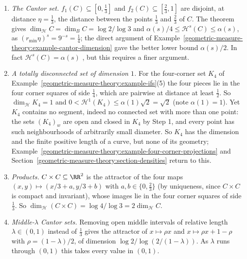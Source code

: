 \begin{example}\label{geometric-measure-theory:example-similarity-dimension}
\begin{enumerate}
\item \emph{The Cantor set.} $f_1(C) \subseteq [0, \frac13]$ and $f_2(C) \subseteq [\frac23, 1]$ are disjoint, at distance $\eta = \frac13$, the distance between the points $\frac13$ and $\frac23$ of $C$.
The theorem gives $\dim_{\mathcal{H}}C = \dim_BC = \log 2/\log 3$ and $\alpha(s)/4 \leq \mathcal{H}^s(C) \leq \alpha(s)$, as $(r_{\min}\eta)^s = 9^{-s} = \frac14$; the direct argument of
Example~\ref{geometric-measure-theory:example-cantor-dimension} gave the better lower bound $\alpha(s)/2$. In fact $\mathcal{H}^s(C) = \alpha(s)$ \cite{falconer-fractal}, but this requires a finer argument.
\item \emph{A totally disconnected set of dimension $1$.} For the four-corner set $K_4$ of Example~\ref{geometric-measure-theory:example-ifs}(5) the four pieces lie in the four corner squares of side $\frac14$,
which are pairwise at distance at least $\frac12$. So $\dim_{\mathcal{H}}K_4 = 1$ and $0 < \mathcal{H}^1(K_4) \leq \alpha(1)\sqrt2 = \sqrt2$ (note $\alpha(1) = 1$). Yet $K_4$ contains no segment, indeed no
connected set with more than one point: the sets $(K_4)_w$ are open and closed in $K_4$ by Step 1, and every point has such neighbourhoods of arbitrarily small diameter. So $K_4$ has the dimension and
the finite positive length of a curve, but none of its geometry; Example~\ref{geometric-measure-theory:example-four-corner-projections} and Section~\ref{geometric-measure-theory:section-densities} return to this.
\item \emph{Products.} $C \times C \subseteq \RR^2$ is the attractor of the four maps $(x, y) \mapsto (x/3 + a, y/3 + b)$ with $a, b \in \{0, \frac23\}$ (by uniqueness, since $C \times C$ is compact and
invariant), whose images lie in the four corner squares of side $\frac13$. So $\dim_{\mathcal{H}}(C \times C) = \log 4/\log 3 = 2\dim_{\mathcal{H}}C$.
\item \emph{Middle-$\lambda$ Cantor sets.} Removing open middle intervals of relative length $\lambda \in (0, 1)$ instead of $\frac13$ gives the attractor of $x \mapsto \rho x$ and
$x \mapsto \rho x + 1 - \rho$ with $\rho = (1 - \lambda)/2$, of dimension $\log 2/\log(2/(1 - \lambda))$. As $\lambda$ runs through $(0, 1)$ this takes every value in $(0, 1)$.
\end{enumerate}
\end{example}

